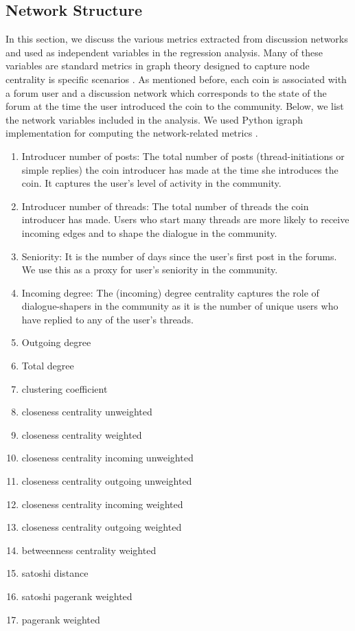 \subsection{Network Structure}
In this section, we discuss the various metrics extracted from discussion networks and used as independent variables in the regression analysis. Many of these variables are standard metrics in graph theory designed to capture node centrality is specific scenarios \cite{KleinbergNetworks}. As mentioned before, each coin is associated with a forum user and a discussion network which corresponds to the state of the forum at the time the user introduced the coin to the community. Below, we list the network variables included in the analysis. We used Python igraph implementation for computing the network-related metrics \cite{igraph}.
\begin{enumerate}
  \item{Introducer number of posts:} The total number of posts (thread-initiations or simple replies) the coin introducer has made at the time she introduces the coin. It captures the user's level of activity in the community.
  \item{Introducer number of threads:} The total number of threads the coin introducer has made. Users who start many threads are more likely to receive incoming edges and to shape the dialogue in the community.
  \item{Seniority:} It is the number of days since the user's first post in the forums. We use this as a proxy for user's seniority in the community.
  \item{Incoming degree:} The (incoming) degree centrality captures the role of dialogue-shapers in the community as it is the number of unique users who have replied to any of the user's threads.
  \item{Outgoing degree}
  \item{Total degree}
  \item{clustering coefficient}
  \item{closeness centrality unweighted}
  \item{closeness centrality weighted}
  \item{closeness centrality incoming unweighted}
  \item{closeness centrality outgoing unweighted}
  \item{closeness centrality incoming weighted}
  \item{closeness centrality outgoing weighted}
  \item{betweenness centrality weighted}
  \item{satoshi distance}
  \item{satoshi pagerank weighted}
  \item{pagerank weighted}
\end{enumerate}
